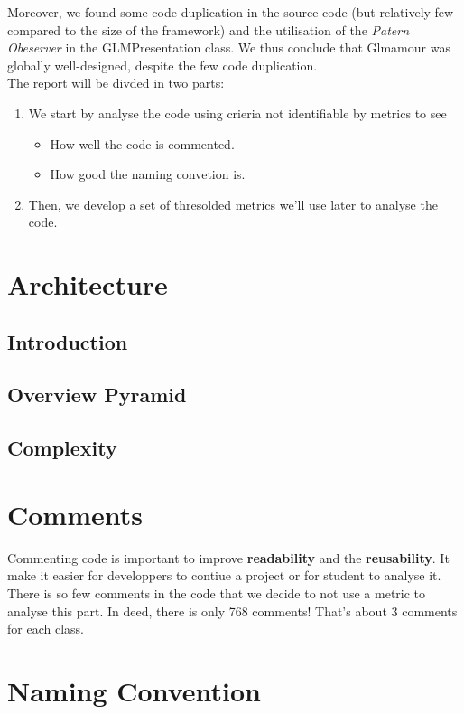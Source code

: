 \documentclass[11pt,a4paper]{article}
\begin{document}
Moreover, we found some code duplication in the source code (but relatively few compared to the size of the framework) and the utilisation  of the \textit{Patern Obeserver} in the GLMPresentation class. We thus conclude that Glmamour was globally well-designed, despite the few code duplication.\\

The report will be divded in two parts:
\begin{enumerate}
	\item We start by analyse the code using crieria not identifiable by metrics to see
		\begin{itemize}
		\item How well the code is commented.
		\item How good the naming convetion is.
		\end{itemize}
	\item Then, we develop a set of thresolded metrics we'll use later to analyse the code.   
 \end{enumerate}
\newpage
\section{Architecture}
\subsection{Introduction}
\subsection{Overview Pyramid}
\subsection{Complexity}
\section{Comments}
Commenting code is important to improve \textbf{readability} and  the \textbf{reusability}. It make it easier for developpers to contiue a project or for student to analyse it.\\

There is so few comments in the code that we decide to not use a metric to analyse this part. In deed, there is only 768 comments! That's about 3 comments for each class.
\section{Naming Convention}
\end{document}
